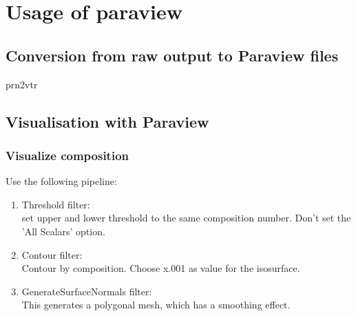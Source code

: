 
\section{Usage of paraview}

\subsection{Conversion from raw output to Paraview files}
prn2vtr

\subsection{Visualisation with Paraview}

\subsubsection{Visualize composition}

Use the following pipeline:
\begin{enumerate}[-]
\item Threshold filter:\\
set upper and lower threshold to the same composition number. Don't set the 'All Scalars' option.

\item Contour filter:\\
Contour by composition. Choose x.001 as value for the isosurface.

\item GenerateSurfaceNormals filter:\\
This generates a polygonal mesh, which has a smoothing effect.
\end{enumerate}